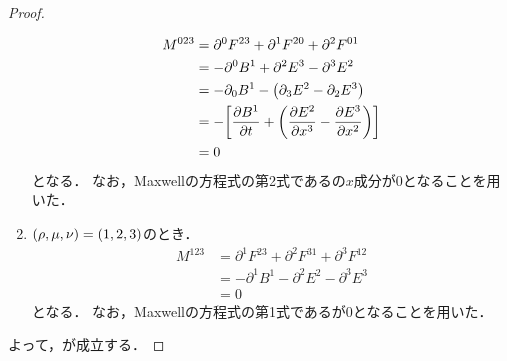 \documentclass{report}
\begin{document}
\begin{proof}
\begin{enumerate}
          \begin{align}
            M^{023} &= \partial^0F^{23} + \partial^1F^{20} + \partial^2F^{01} \\ 
            &= -\partial^0B^1 + \partial^2E^3 - \partial^3E^2 \\ 
            &= -\partial_0B^1 - \qty(\partial_3E^2 - \partial_2E^3) \\ 
            &= -\qty[\pdv{B^1}{t} + \qty(\pdv{E^2}{x^3} - \pdv{E^3}{x^2})] \\ 
            &= 0
          \end{align}
          となる．
          なお，Maxwellの方程式の第2式であるの$x$成分が0となることを用いた．
        \item $\qty(\rho, \mu, \nu) = (1, 2, 3)$のとき．
          \begin{align}
            M^{123} &= \partial^1F^{23} + \partial^2F^{31} + \partial^3F^{12} \\ 
            &= -\partial^1B^1 - \partial^2E^2 - \partial^3E^3 \\ 
            &= 0
          \end{align}
          となる．
          なお，Maxwellの方程式の第1式であるが0となることを用いた．
      \end{enumerate}
      よって，が成立する．
    \end{proof}
\end{document}
